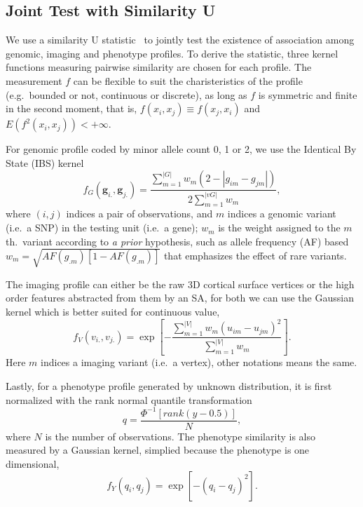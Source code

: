 \subsection{Joint Test with Similarity U}
\newcommand{\vg}{\boldsymbol{g}}
\newcommand{\vv}{\boldsymbol{v}}
We use a similarity U statistic~\cite{UST1, UST2} to jointly test the existence of association among genomic, imaging and phenotype profiles. To derive the statistic, three kernel functions measuring pairwise similarity are chosen for each profile. The measurement $f$ can be flexible to suit the charisteristics of the profile (e.g.\ bounded or not, continuous or discrete), as long as $f$ is symmetric and finite in the second moment, that is, $f(x_i,x_j) \equiv f(x_j,x_i)$ and $E(f^2(x_i, x_j))<+\infty$.

For genomic profile coded by minor allele count 0, 1 or 2, we use the Identical By State (IBS) kernel
\label{eq:wSG}
\[ f_G(\vg_{i.}, \vg_{j.}) = \frac{\sum_{m=1}^{|G|}{w_m(2 - |g_{im} - g_{jm}|)}} {2\sum_{m=1}^{|vG|}{w_m}}, \]
where $(i,j)$ indices a pair of observations, and $m$ indices a genomic variant (i.e.\ a SNP) in the testing unit (i.e.\ a gene); $w_m$ is the weight assigned to the $m$ th.\ variant according to \textit{a prior} hypothesis, such as allele frequency (AF) based $w_m=\sqrt{AF(g_{.m})[1-AF(g_{.m})]}$ that emphasizes the effect of rare variants.

The imaging profile can either be the raw 3D cortical surface vertices or the high order features abstracted from them by an SA, for both we can use the Gaussian kernel which is better suited for continuous value,
\label{eq:wSV}
\[ f_V(v_{i.},v_{j.}) = \exp{ [-\frac{\sum_{m=1}^{|V|}{w_m{(u_{im}-u_{jm})}^2}} {\sum_{m=1}^{|V|}{w_m}}] }. \]
Here $m$ indices a imaging variant (i.e.\ a vertex), other notations means the same.

Lastly, for a phenotype profile generated by unknown distribution, it is first normalized with the rank normal quantile transformation
\[ q = \frac{\Phi^{-1}[rank(y - 0.5)]}{N}, \]
where $N$ is the number of observations. The phenotype similarity is also measured by a Gaussian kernel, simplied because the phenotype is one dimensional,
\[ f_Y(q_i, q_j) = \exp{[-{(q_i - q_j)}^2]}. \]

